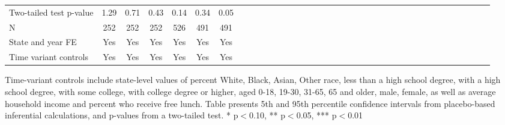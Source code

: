\begin{table}[htbp]
\begin{center}
\begin{threeparttable}
\begin{tabular}{l*{6}{c c c c c c}}
Two-tailed test p-value&        1.29   &        0.71   &        0.43   &       \cellcolor[cmyk]{0.2,0,0,0}    0.14   &       \cellcolor[cmyk]{0.2,0,0,0}    0.34   &    \cellcolor[cmyk]{0.2,0,0,0}    0.05   \\
N                   &         252   &         252   &         252   &         526   &         491   &         491   \\
\midrule
State and year FE                              & Yes   & Yes   & Yes   & Yes   & Yes   & Yes            \\
Time variant controls                  & Yes   & Yes   & Yes   & Yes   & Yes   & Yes            \\
\bottomrule
\end{tabular}
\begin{tablenotes}
\tiny
\item Time-variant controls include state-level values of percent White, Black, Asian, Other race, less than a high school degree, with a high school degree, with some college, with college degree or higher, aged 0-18, 19-30, 31-65, 65 and older, male, female, as well as average household income and percent who receive free lunch.  Table presents 5th and 95th percentile confidence intervals from placebo-based inferential calculations, and p-values from a two-tailed test. * p$<$0.10, ** p$<$0.05, *** p$<$0.01
\end{tablenotes}
\end{threeparttable}
\end{center}
\end{table}
